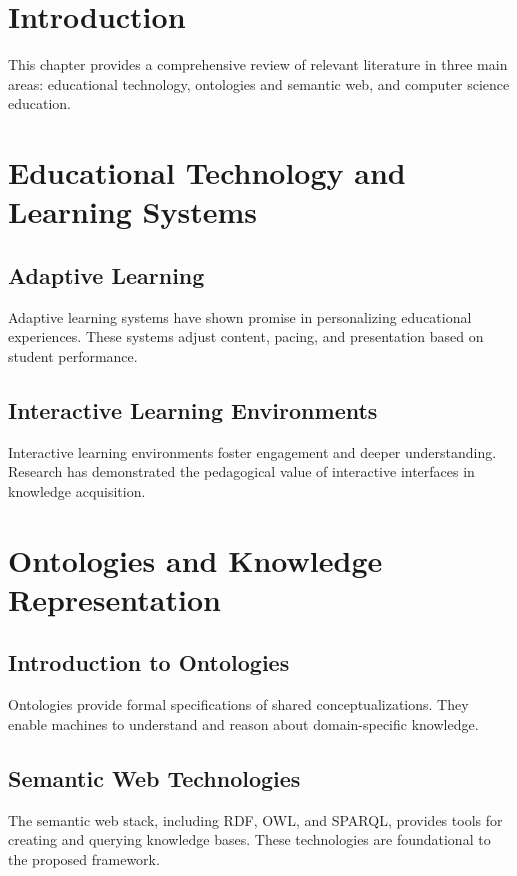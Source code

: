 \section{Introduction}

This chapter provides a comprehensive review of relevant literature in three main areas: educational technology, ontologies and semantic web, and computer science education.

\section{Educational Technology and Learning Systems}

\subsection{Adaptive Learning}

Adaptive learning systems have shown promise in personalizing educational experiences. These systems adjust content, pacing, and presentation based on student performance.

\subsection{Interactive Learning Environments}

Interactive learning environments foster engagement and deeper understanding. Research has demonstrated the pedagogical value of interactive interfaces in knowledge acquisition.

\section{Ontologies and Knowledge Representation}

\subsection{Introduction to Ontologies}

Ontologies provide formal specifications of shared conceptualizations. They enable machines to understand and reason about domain-specific knowledge.

\subsection{Semantic Web Technologies}

The semantic web stack, including RDF, OWL, and SPARQL, provides tools for creating and querying knowledge bases. These technologies are foundational to the proposed framework.

